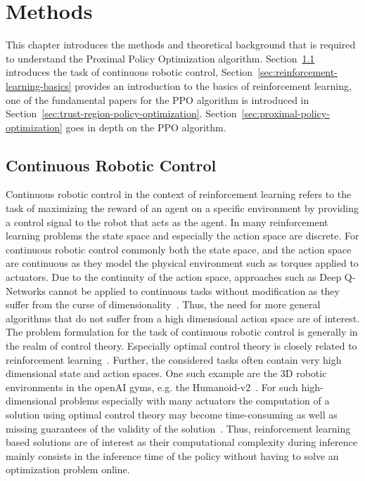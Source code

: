 \chapter{Methods}\label{ch:methods}
This chapter introduces the methods and theoretical background that is required to understand the Proximal Policy Optimization algorithm.
Section~\ref{sec:continuous-robotic-control} introduces the task of continuous robotic control, Section~\ref{sec:reinforcement-learning-basics}
provides an introduction to the basics of reinforcement learning, one of the fundamental papers for the PPO algorithm is introduced in Section~\ref{sec:trust-region-policy-optimization}.
Section~\ref{sec:proximal-policy-optimization} goes in depth on the PPO algorithm.


\section{Continuous Robotic Control}\label{sec:continuous-robotic-control}
Continuous robotic control in the context of reinforcement learning refers to the task of maximizing the reward of an agent
on a specific environment by providing a control signal to the robot that acts as the agent. %
In many reinforcement learning problems the state space and especially the action space are discrete. %
For continuous robotic control commonly both the state space, and the action space are continuous as they model
the physical environment such as torques applied to actuators. %
Due to the continuity of the action space, approaches such as Deep Q-Networks cannot be applied to continuous tasks
without modification as they suffer from the curse of dimensionality~\cite{journals/corr/LillicrapHPHETS15}.
Thus, the need for more general algorithms that do not suffer from a high dimensional action space are of interest.
The problem formulation for the task of continuous robotic control is generally in the realm of control theory.
Especially optimal control theory is closely related to reinforcement learning~\cite{Gottschalk2019}.
Further, the considered tasks often contain very high dimensional state and action spaces.
One such example are the 3D robotic environments in the openAI gyms, e.g. the Humanoid-v2~\cite{brockman2016openai}.
For such high-dimensional problems especially with many actuators
the computation of a solution using optimal control theory may become time-consuming
as well as missing guarantees of the validity of the solution~\cite{Gottschalk2019}.
Thus, reinforcement learning based  solutions are of interest as their computational complexity
during inference mainly consists in the inference time of the
policy without having to solve an optimization problem online.


